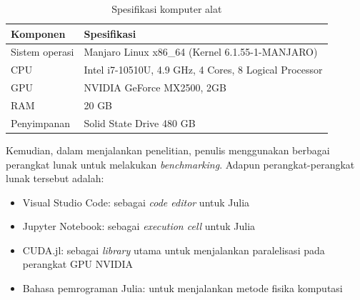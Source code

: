 \begin{table}[ht]
  \centering
  \caption{Spesifikasi komputer alat}
  \begin{tabular}{|M{5cm}|M{8cm}|}
    \hline
    \textbf{Komponen} & \textbf{Spesifikasi}                                   \\
    \hline
    Sistem operasi    & Manjaro Linux x86\_64 (Kernel 6.1.55-1-MANJARO)        \\
    \hline
    CPU               & Intel i7-10510U, 4.9 GHz, 4 Cores, 8 Logical Processor \\
    \hline
    GPU               & NVIDIA GeForce MX2500, 2GB                             \\
    \hline
    RAM               & 20 GB                                                  \\
    \hline
    Penyimpanan       & Solid State Drive 480 GB                               \\
    \hline
  \end{tabular}
\end{table}

Kemudian, dalam menjalankan penelitian, penulis menggunakan berbagai perangkat
lunak untuk melakukan \emph{benchmarking}. Adapun perangkat-perangkat lunak
tersebut adalah:
\begin{itemize}
  \item Visual Studio Code: sebagai \emph{code editor} untuk Julia

  \item Jupyter Notebook: sebagai \emph{execution cell} untuk Julia

  \item CUDA.jl: sebagai \emph{library} utama untuk menjalankan paralelisasi pada
        perangkat GPU NVIDIA

  \item Bahasa pemrograman Julia: untuk menjalankan metode fisika komputasi

\end{itemize}


